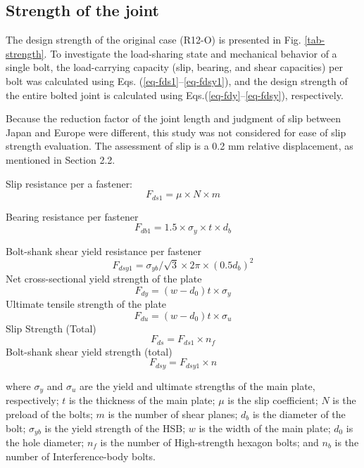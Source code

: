 \subsection{Strength of the joint}
The design strength of the original case (R12-O) is presented in Fig. \ref{tab-strength}. To investigate the load-sharing state and mechanical behavior of a single bolt, the load-carrying capacity (slip, bearing, and shear capacities) per bolt was calculated using Eqs. (\ref{eq-fds1}–\ref{eq-fdsy1}), and the design strength of the entire bolted joint is calculated using Eqs.(\ref{eq-fdy}–\ref{eq-fdsy}), respectively. \par
Because the reduction factor of the joint length and judgment of slip between Japan and Europe were different, this study was not considered for ease of slip strength evaluation. The assessment of slip is a 0.2 mm relative displacement, as mentioned in Section 2.2.

\noindent Slip resistance per a fastener:
\begin{equation}
    \label{eq-fds1}
    F_{ds1} = \mu \times N \times m
\end{equation}

Bearing resistance per fastener
\begin{equation}
    \label{eq-fdb1}
    F_{db1} = 1.5 \times \sigma_y \times t \times d_b
\end{equation}

Bolt-shank shear yield resistance per fastener
\begin{equation}
    \label{eq-fdsy1}
    F_{dsy1} = \sigma_{yb} / \sqrt{3} \times 2 \pi \times (0.5d_b)^2
\end{equation}
Net cross-sectional yield strength of the plate
\begin{equation}
    \label{eq-fdy}
    F_{dy} = (w-d_0)t \times \sigma_y
\end{equation}
Ultimate tensile strength of the plate
\begin{equation}
    \label{eq-fdu}
    F_{du} = (w-d_0)t \times \sigma_u
\end{equation}
Slip Strength (Total)
\begin{equation}
    \label{eq-fds}
    F_{ds} = F_{ds1} \times n_{f}
\end{equation}
Bolt-shank shear yield strength (total)
\begin{equation}
    \label{eq-fdsy}
    F_{dsy} = F_{dsy1} \times n
\end{equation}

where $\sigma_y$ and $\sigma_u$ are the yield and ultimate strengths of the main plate, respectively; $t$ is the thickness of the main plate; $\mu$ is the slip coefficient; $N$ is the preload of the bolts; $m$ is the number of shear planes; $d_b$ is the diameter of the bolt; $\sigma_{yb}$ is the yield strength of the HSB; $w$ is the width of the main plate; $d_0$ is the hole diameter; $n_{f}$ is the number of High-strength hexagon bolts; and $n_b$ is the number of Interference-body bolts.

